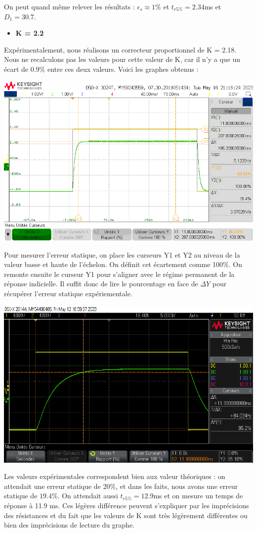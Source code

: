 \documentclass[12pt]{article}
\begin{document}
On peut quand même relever les résultats : $\epsilon_s \approx 1\%$ et $t_{r5\%} = 2.34$ms et $D_1 = 30.7$. 
\newpage
\begin{itemize}
\item \bf \large K = 2.2
\end{itemize}
Expérimentalement, nous réalisons un correcteur proportionnel de K = 2.18. Nous ne recalculons pas les valeurs pour cette valeur de K, car il n'y a que un écart de 0.9$\%$ entre ces deux valeurs. Voici les graphes obtenus : 
\begin{center}
    \includegraphics[width = 18 cm]{TP3/Syst_1/P/estat-syst1-k2.2.png}
\end{center}
Pour mesurer l'erreur statique, on place les curseurs Y1 et Y2 au niveau de la valeur basse et haute de l'échelon. On définit cet écartement comme 100$\%$. On remonte ensuite le curseur Y1 pour s'aligner avec le régime permanent de la réponse indicielle. Il suffit donc de lire le pourcentage en face de $\Delta Y$ pour récupérer l'erreur statique expériementale.

    \begin{center}
    \includegraphics[width = 18 cm]{TP3/Syst_1/P/tr5prct_syst1_K2_2.png}
\end{center}
Les valeurs expérimentales correspondent bien aux valeur théoriques : on attendait une erreur statique de 20$\%$, et dans les faits, nous avons une erreur statique de $19.4\%$. On attendait aussi $t_{r5\%} = 12.9$ms et on mesure un temps de réponse à 11.9 ms. Ces légères différence peuvent s'expliquer par les imprécisions des résistances et du fait que les valeurs de K sont très légèrement différentes ou bien des imprécisions de lecture du graphe.
\end{document}
